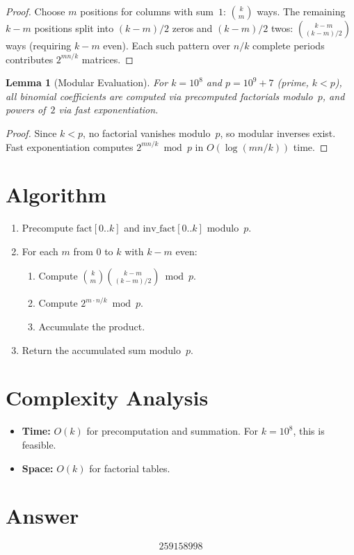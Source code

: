 \documentclass[11pt]{article}
\newtheorem{lemma}[theorem]{Lemma}
\theoremstyle{definition}
\begin{document}
\begin{proof}
Choose $m$ positions for columns with sum~$1$: $\binom{k}{m}$ ways. The remaining $k-m$ positions split into $(k-m)/2$ zeros and $(k-m)/2$ twos: $\binom{k-m}{(k-m)/2}$ ways (requiring $k-m$ even). Each such pattern over $n/k$ complete periods contributes $2^{mn/k}$ matrices.
\end{proof}

\begin{lemma}[Modular Evaluation]
For $k = 10^8$ and $p = 10^9+7$ (prime, $k < p$), all binomial coefficients are computed via precomputed factorials modulo~$p$, and powers of~$2$ via fast exponentiation.
\end{lemma}

\begin{proof}
Since $k < p$, no factorial vanishes modulo~$p$, so modular inverses exist. Fast exponentiation computes $2^{mn/k} \bmod p$ in $O(\log(mn/k))$ time.
\end{proof}

\section{Algorithm}

\begin{enumerate}
\item Precompute $\mathrm{fact}[0..k]$ and $\mathrm{inv\_fact}[0..k]$ modulo~$p$.
\item For each $m$ from $0$ to $k$ with $k - m$ even:
  \begin{enumerate}
  \item Compute $\binom{k}{m}\binom{k-m}{(k-m)/2} \bmod p$.
  \item Compute $2^{m \cdot n/k} \bmod p$.
  \item Accumulate the product.
  \end{enumerate}
\item Return the accumulated sum modulo~$p$.
\end{enumerate}

\section{Complexity Analysis}

\begin{itemize}
\item \textbf{Time:} $O(k)$ for precomputation and summation. For $k = 10^8$, this is feasible.
\item \textbf{Space:} $O(k)$ for factorial tables.
\end{itemize}

\section{Answer}

\[
\boxed{259158998}
\]
\end{document}
